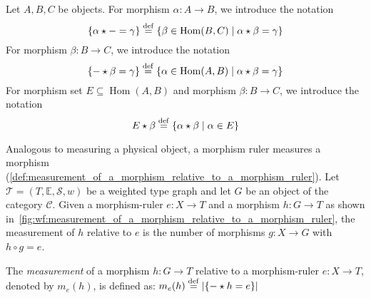    \begin{figure}[H]
        \centering
        \caption{}
        \label{fig:wf:measurement_of_a_morphism_relative_to_a_morphism_ruler}
    \end{figure}  
\begin{notation}
Let \(A,B,C\) be objects. For morphism $\alpha\colon A\to B$, we introduce the notation 
          $$\{ \alpha \star - = \gamma \} \overset{\operatorname{def}}{=} \{ \beta \in \operatorname{Hom}(B, C) \mid \alpha \star \beta = \gamma \}$$ 
For morphism $\beta\colon B\to C$, we introduce the notation
          $$\{ - \star \beta = \gamma \}  \overset{\operatorname{def}}{=} \{ \alpha \in \operatorname{Hom}(A, B) \mid \alpha \star \beta = \gamma \}$$
For morphism set $E \subseteq \operatorname{Hom}(A,B)$ and morphism $\beta\colon B\to C$, we introduce the notation
          $$E \star \beta \overset{\operatorname{def}}{=} \{ \alpha \star \beta \mid \alpha \in E \}$$
\end{notation}
Analogous to measuring a physical object, a morphism ruler measures a morphism (\autoref{def:measurement_of_a_morphism_relative_to_a_morphism_ruler}).
Let \(\mathcal{T}=(T,\mathbb{E},\mathcal{S},w)\) be a weighted type graph and let \(G\) be an object of the category \(\mathcal{C}\).
Given a morphism-ruler \(e\colon X\to T\) and a morphism \(h\colon G\to T\) as shown in~\autoref{fig:wf:measurement_of_a_morphism_relative_to_a_morphism_ruler},
the measurement of \(h\) relative to \(e\) is the number of morphisms \(g \colon X\to G\) with \(h\circ g = e\). 
\begin{definition}
    \label{def:measurement_of_a_morphism_relative_to_a_morphism_ruler}
    The \emph{measurement} of a morphism \( h:G \to T \) relative to a morphism-ruler \( e: X \to T \), denoted by $m_e(h)$, is defined as:
                \(
                m_e(h) 
                    \overset{\operatorname{def}}{=}
                |\{- \star h = e\}|
                \)
\end{definition}
